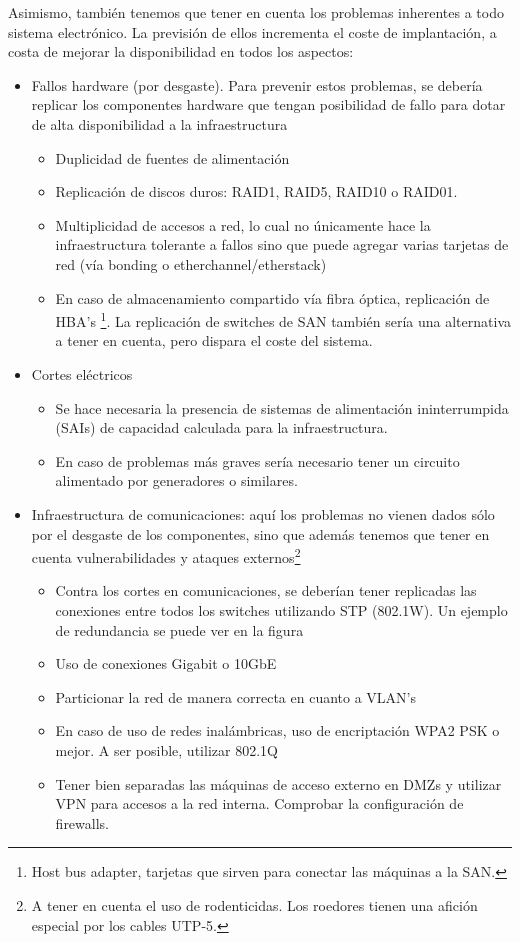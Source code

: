 Asimismo, también tenemos que tener en cuenta los problemas inherentes a todo sistema electrónico. La previsión de ellos incrementa el coste de implantación, a costa de mejorar la disponibilidad en todos los aspectos:
\begin{itemize}
	\item{Fallos hardware (por desgaste). Para prevenir estos problemas, se debería replicar los componentes hardware que tengan posibilidad de fallo para dotar de alta disponibilidad a la infraestructura}
	\begin{itemize}
		\item{Duplicidad de fuentes de alimentación }
		\item{Replicación de discos duros: RAID1, RAID5, RAID10 o RAID01. }
		\item{Multiplicidad de accesos a red, lo cual no únicamente hace la infraestructura tolerante a fallos sino que puede agregar varias tarjetas de red (vía bonding o etherchannel/etherstack) }
		\item{En caso de almacenamiento compartido vía fibra óptica, replicación de HBA's \footnote{Host bus adapter, tarjetas que sirven para conectar las máquinas a la SAN.}. La replicación de switches de SAN también sería una alternativa a tener en cuenta, pero dispara el coste del sistema. }
	\end{itemize}

	\item{Cortes eléctricos}
	\begin{itemize}
		\item{Se hace necesaria la presencia de sistemas de alimentación ininterrumpida (SAIs) de capacidad calculada para la infraestructura.}
		\item{En caso de problemas más graves sería necesario tener un circuito alimentado por generadores o similares.}
	\end{itemize}

	\item{Infraestructura de comunicaciones: aquí los problemas no vienen dados sólo por el desgaste de los componentes, sino que además tenemos que tener en cuenta vulnerabilidades y ataques externos\footnote{A tener en cuenta el uso de rodenticidas. Los roedores tienen una afición especial por los cables UTP-5.}}
	\begin{itemize}
		\item{Contra los cortes en comunicaciones, se deberían tener replicadas las conexiones entre todos los switches utilizando STP (802.1W). Un ejemplo de redundancia se puede ver en la figura }
		\item{Uso de conexiones Gigabit o 10GbE }
		\item{Particionar la red de manera correcta en cuanto a VLAN's}
		\item{En caso de uso de redes inalámbricas, uso de encriptación WPA2 PSK o mejor. A ser posible, utilizar 802.1Q}
		\item{Tener bien separadas las máquinas de acceso externo en DMZs y utilizar VPN para accesos a la red interna. Comprobar la configuración de firewalls.}
	\end{itemize}


\end{itemize}
